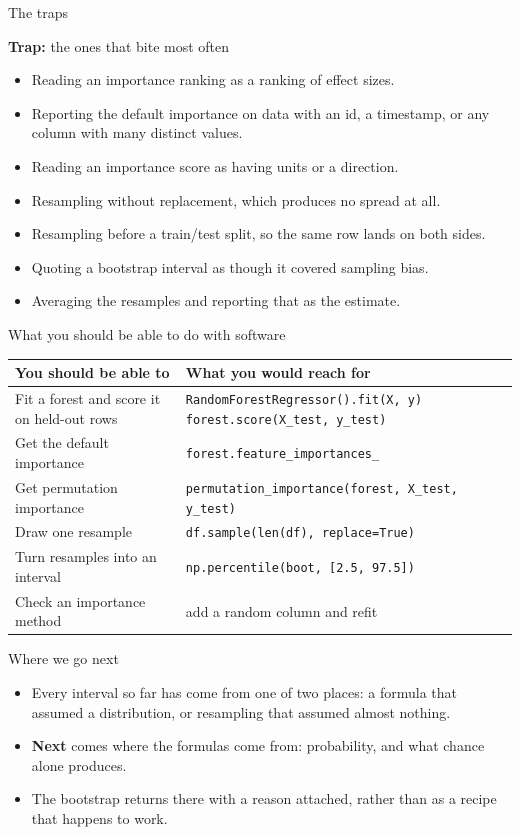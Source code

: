 \documentclass[aspectratio=169]{beamer}
\newenvironment{trap}[1]{\begin{alertblock}{\textbf{Trap:} #1}}{\end{alertblock}}
\begin{document}
\begin{frame}{The traps}
\begin{trap}{the ones that bite most often}
\begin{itemize}
  \item Reading an importance ranking as a ranking of effect sizes.
  \item Reporting the default importance on data with an id, a timestamp, or any column with many
        distinct values.
  \item Reading an importance score as having units or a direction.
  \item Resampling without replacement, which produces no spread at all.
  \item Resampling before a train/test split, so the same row lands on both sides.
  \item Quoting a bootstrap interval as though it covered sampling bias.
  \item Averaging the resamples and reporting that as the estimate.
\end{itemize}
\end{trap}
\end{frame}

\begin{frame}{What you should be able to do with software}
\small
\begin{center}\footnotesize
\begin{tabular}{p{} p{}}
\toprule
\textbf{You should be able to} & \textbf{What you would reach for} \\
\midrule
Fit a forest and score it on held-out rows &
\texttt{RandomForestRegressor().fit(X, y)} \newline \texttt{forest.score(X\_test, y\_test)} \\
Get the default importance & \texttt{forest.feature\_importances\_} \\
Get permutation importance & \texttt{permutation\_importance(forest, X\_test, y\_test)} \\
Draw one resample & \texttt{df.sample(len(df), replace=True)} \\
Turn resamples into an interval & \texttt{np.percentile(boot, [2.5, 97.5])} \\
Check an importance method & add a random column and refit \\
\bottomrule
\end{tabular}
\end{center}
\end{frame}

\begin{frame}{Where we go next}
\begin{itemize}
  \item Every interval so far has come from one of two places: a formula that assumed a
        distribution, or resampling that assumed almost nothing.
  \item \textbf{Next} comes where the formulas come from: probability, and what chance alone
        produces.
  \item The bootstrap returns there with a reason attached, rather than as a recipe that happens
        to work.
\end{itemize}
\end{frame}
\end{document}
